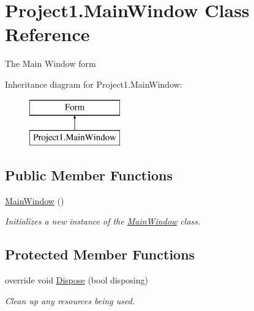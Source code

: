 \hypertarget{classProject1_1_1MainWindow}{}\section{Project1.\+Main\+Window Class Reference}
\label{classProject1_1_1MainWindow}


The Main Window form  


Inheritance diagram for Project1.\+Main\+Window\+:\begin{figure}[H]
\begin{center}
\leavevmode
\includegraphics[height=2.000000cm]{classProject1_1_1MainWindow}
\end{center}
\end{figure}
\subsection*{Public Member Functions}
\begin{DoxyCompactItemize}
\item 
\hyperlink{classProject1_1_1MainWindow_ac8ada21cf001233b859c3c8fd34dbd14}{Main\+Window} ()
\begin{DoxyCompactList}\small\item\em Initializes a new instance of the \hyperlink{classProject1_1_1MainWindow}{Main\+Window} class. \end{DoxyCompactList}\end{DoxyCompactItemize}
\subsection*{Protected Member Functions}
\begin{DoxyCompactItemize}
\item 
override void \hyperlink{classProject1_1_1MainWindow_a6a752bcb31d44385e4f21b1e75861615}{Dispose} (bool disposing)
\begin{DoxyCompactList}\small\item\em Clean up any resources being used. \end{DoxyCompactList}\end{DoxyCompactItemize}
